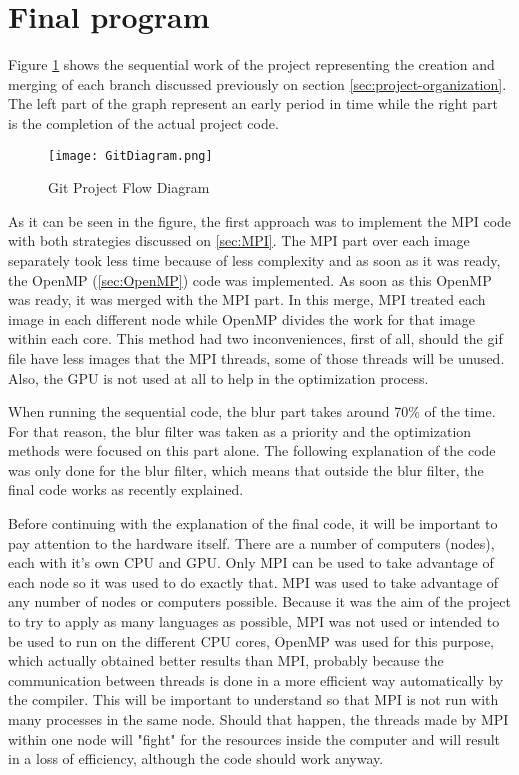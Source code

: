 \documentclass[conference,compsoc]{IEEEtran}
\begin{document}
\section{Final program}

Figure \ref{fig:Git-Project-Flow-Diagram} shows the sequential work of the project representing the creation and merging of each branch discussed previously on section \ref{sec:project-organization}. The left part of the graph represent an early period in time while the right part is the completion of the actual project code.

\begin{figure}[H]
	\texttt{[image: GitDiagram.png]}	\centering
	\caption{Git Project Flow Diagram	\label{fig:Git-Project-Flow-Diagram}}
\end{figure}

As it can be seen in the figure, the first approach was to implement the MPI code with both strategies discussed on \ref{sec:MPI}. The MPI part over each image separately took less time because of less complexity and as soon as it was ready, the OpenMP (\ref{sec:OpenMP}) code was implemented. As soon as this OpenMP was ready, it was merged with the MPI part. In this merge, MPI treated each image in each different node while OpenMP divides the work for that image within each core. This method had two inconveniences, first of all, should the gif file have less images that the MPI threads, some of those threads will be unused. Also, the GPU is not used at all to help in the optimization process.

When running the sequential code, the blur part takes around 70\% of the time. For that reason, the blur filter was taken as a priority and the optimization methods were focused on this part alone. The following explanation of the code was only done for the blur filter, which means that outside the blur filter, the final code works as recently explained.

Before continuing with the explanation of the final code, it will be important to pay attention to the hardware itself. There are a number of computers (nodes), each with it's own CPU and GPU. Only MPI can be used to take advantage of each node so it was used to do exactly that. MPI was used to take advantage of any number of nodes or computers possible. Because it was the aim of the project to try to apply as many languages as possible, MPI was not used or intended to be used to run on the different CPU cores, OpenMP was used for this purpose, which actually obtained better results than MPI, probably because the communication between threads is done in a more efficient way automatically by the compiler. This will be important to understand so that MPI is not run with many processes in the same node. Should that happen, the threads made by MPI within one node will "fight" for the resources inside the computer and will result in a loss of efficiency, although the code should work anyway.
\end{document}
